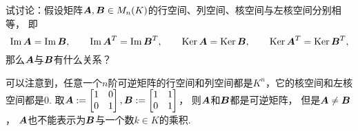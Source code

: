 \begin{example}
试讨论：假设矩阵\(\boldsymbol{A},\boldsymbol{B} \in M_n(K)\)的行空间、列空间、核空间与左核空间分别相等，
即\begin{equation*}
	\Im\boldsymbol{A} = \Im\boldsymbol{B},
	\qquad
	\Im\boldsymbol{A}^T = \Im\boldsymbol{B}^T,
	\qquad
	\operatorname{Ker}\boldsymbol{A} = \operatorname{Ker}\boldsymbol{B},
	\qquad
	\operatorname{Ker}\boldsymbol{A}^T = \operatorname{Ker}\boldsymbol{B}^T,
\end{equation*}
那么\(\boldsymbol{A}\)与\(\boldsymbol{B}\)有什么关系？
\begin{solution}
可以注意到，任意一个\(n\)阶可逆矩阵的行空间和列空间都是\(K^n\)，它的核空间和左核空间都是\(0\).
取\(
	\boldsymbol{A}
	:=
	\begin{bmatrix}
		1 & 0 \\
		0 & 1
	\end{bmatrix},
	\boldsymbol{B}
	:=
	\begin{bmatrix}
		1 & 1 \\
		0 & 1
	\end{bmatrix}
\)，
则\(\boldsymbol{A}\)和\(\boldsymbol{B}\)都是可逆矩阵，
但是\(\boldsymbol{A} \neq \boldsymbol{B}\)，
\(\boldsymbol{A}\)也不能表示为\(\boldsymbol{B}\)与一个数\(k \in K\)的乘积.
\end{solution}
\end{example}

